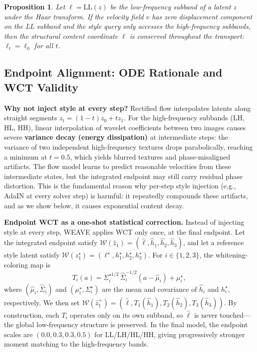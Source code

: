 \documentclass[letterpaper]{article}
\newtheorem{proposition}{Proposition}
\begin{document}
\begin{proposition}
\label{prop:orthogonal}
Let $\ell = \text{LL}(z)$ be the low-frequency subband of a latent $z$ under the Haar transform.
If the velocity field $v$ has zero displacement component on the LL subband and the style query only accesses the high-frequency subbands, then the structural content coordinate $\ell$ is conserved throughout the transport: $\ell_t = \ell_0$ for all $t$.
\end{proposition}

\subsection{Endpoint Alignment: ODE Rationale and WCT Validity}
\label{sec:eota}

\textbf{Why not inject style at every step?}
Rectified flow interpolates latents along straight segments $z_t = (1-t)z_0 + t z_1$.
For the high-frequency subbands (LH, HL, HH), linear interpolation of wavelet coefficients between two images causes severe \textbf{variance decay (energy dissipation)} at intermediate steps: the variance of two independent high-frequency textures drops parabolically, reaching a minimum at $t=0.5$, which yields blurred textures and phase-misaligned artifacts.
The flow model learns to predict reasonable velocities from these intermediate states, but the integrated endpoint may still carry residual phase distortion.
This is the fundamental reason why per-step style injection (e.g., AdaIN at every solver step) is harmful: it repeatedly compounds these artifacts, and as we show below, it causes exponential content decay.

\textbf{Endpoint WCT as a one-shot statistical correction.}
Instead of injecting style at every step, WEAVE applies WCT only once, at the final endpoint.
Let the integrated endpoint satisfy $\mathcal W(\hat z_1) = (\hat \ell,\hat h_1,\hat h_2,\hat h_3)$, and let a reference style latent satisfy $\mathcal W(z_1^\star) = (\ell^\star,h_1^\star,h_2^\star,h_3^\star)$.
For $i\in\{1,2,3\}$, the whitening-coloring map is
\begin{equation}
T_i(a) = \Sigma_i^{\star 1/2}\,\hat\Sigma_i^{-1/2}(a-\hat\mu_i)+\mu_i^\star,
\end{equation}
where $(\hat\mu_i,\hat\Sigma_i)$ and $(\mu_i^\star,\Sigma_i^\star)$ are the mean and covariance of $\hat h_i$ and $h_i^\star$, respectively.
We then set $\mathcal W(\hat z_1^+) = (\hat \ell, T_1(\hat h_1), T_2(\hat h_2), T_3(\hat h_3))$.
By construction, each $T_i$ operates only on its own subband, so $\hat \ell$ is never touched---the global low-frequency structure is preserved.
In the final model, the endpoint scales are $(0.0, 0.3, 0.3, 0.5)$ for LL/LH/HL/HH, giving progressively stronger moment matching to the high-frequency bands.
\end{document}
